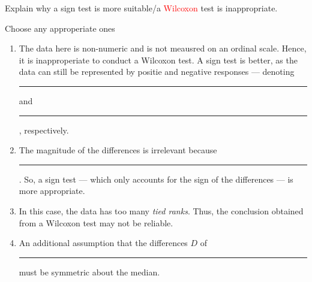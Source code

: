\documentclass[../Notes.tex]{subfiles}
\begin{document}
\begin{note}
  Explain why a sign test is more suitable/a \textcolor{red}{Wilcoxon} test is inappropriate.
  \begin{center}
    \parbox{0.9\textwidth}{
      Choose any approperiate ones
      \begin{enumerate}
        \item The data here is non-numeric and is not meausred on an ordinal scale. Hence, it is inapproperiate to conduct a Wilcoxon test. A sign test is better, as the data can still be represented by positie and negative responses --- denoting \rule{1cm}{0.01mm} and \rule{1cm}{0.01mm}, respectively.
        \item The magnitude of the differences is irrelevant because \rule{1cm}{0.01mm}. So, a sign test --- which only accounts for the sign of the differences --- is more appropriate.
        \item In this case, the data has too many \emph{tied ranks}. Thus, the conclusion obtained from a Wilcoxon test may not be reliable.
        \item An additional assumption that the differences \(D\) of \rule{1cm}{0.01mm} must be symmetric about the median. 
      \end{enumerate}
    }
  \end{center}
\end{note}
\end{document}
